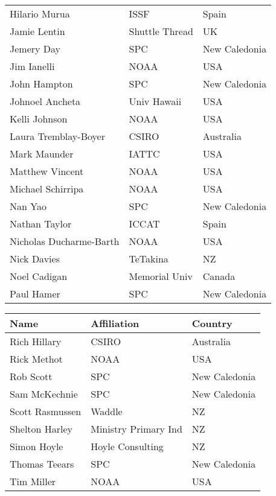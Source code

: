 \documentclass{SCreport}
\newcommand\h[1]{\hspace{#1}}
\newcommand\I[1]{\rule{0pt}{#1}}
\begin{document}
\begin{tabular}{lll}
  Hilario Murua           & ISSF                 & Spain\\
  Jamie Lentin            & Shuttle Thread       & UK\\
  Jemery Day              & SPC                  & New Caledonia\\
  Jim Ianelli             & NOAA                 & USA\\
  John Hampton            & SPC                  & New Caledonia\\
  Johnoel Ancheta         & Univ Hawaii          & USA\\
  Kelli Johnson           & NOAA                 & USA\\
  Laura Tremblay-Boyer    & CSIRO                & Australia\\
  Mark Maunder            & IATTC                & USA\\
  Matthew Vincent         & NOAA                 & USA\\
  Michael Schirripa       & NOAA                 & USA\\
  Nan Yao                 & SPC                  & New Caledonia\\
  Nathan Taylor           & ICCAT                & Spain\\
  Nicholas Ducharme-Barth & NOAA                 & USA\\
  Nick Davies             & TeTakina             & NZ\\
  Noel Cadigan            & Memorial Univ        & Canada\\
  Paul Hamer              & SPC                  & New Caledonia\\
  \hline
\end{tabular}

\begin{tabular}{lll}
  \hline
  Name\h{20ex}            & Affiliation\h{2ex}   & Country\\
  \hline
  Rich Hillary            & CSIRO                & Australia\\
  Rick Methot             & NOAA                 & USA\I{2.6ex}\\
  Rob Scott               & SPC                  & New Caledonia\\
  Sam McKechnie           & SPC                  & New Caledonia\\
  Scott Rasmussen         & Waddle               & NZ\\
  Shelton Harley          & Ministry Primary Ind & NZ\\
  Simon Hoyle             & Hoyle Consulting     & NZ\\
  Thomas Teears           & SPC                  & New Caledonia\\
  Tim Miller              & NOAA                 & USA\\
  \hline
\end{tabular}
\end{document}
